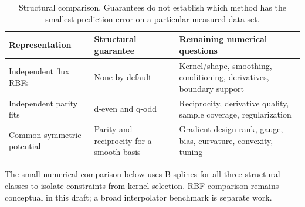 \begin{table}[tb]
\centering\small
\begin{tabularx}{\textwidth}{@{}lYY@{}}
\toprule
Representation & Structural guarantee & Remaining numerical questions\\
\midrule
Independent flux RBFs & None by default & Kernel/shape, smoothing, conditioning,
derivatives, boundary support\\
Independent parity fits & d-even and q-odd & Reciprocity, derivative quality,
sample coverage, regularization\\
Common symmetric potential & Parity and reciprocity for a smooth basis &
Gradient-design rank, gauge, bias, curvature, convexity, tuning\\
\bottomrule
\end{tabularx}
\caption{Structural comparison. Guarantees do not establish which method has
the smallest prediction error on a particular measured data set.}
\end{table}
The small numerical comparison below uses B-splines for all three structural
classes to isolate constraints from kernel selection. RBF comparison remains
conceptual in this draft; a broad interpolator benchmark is separate work.
